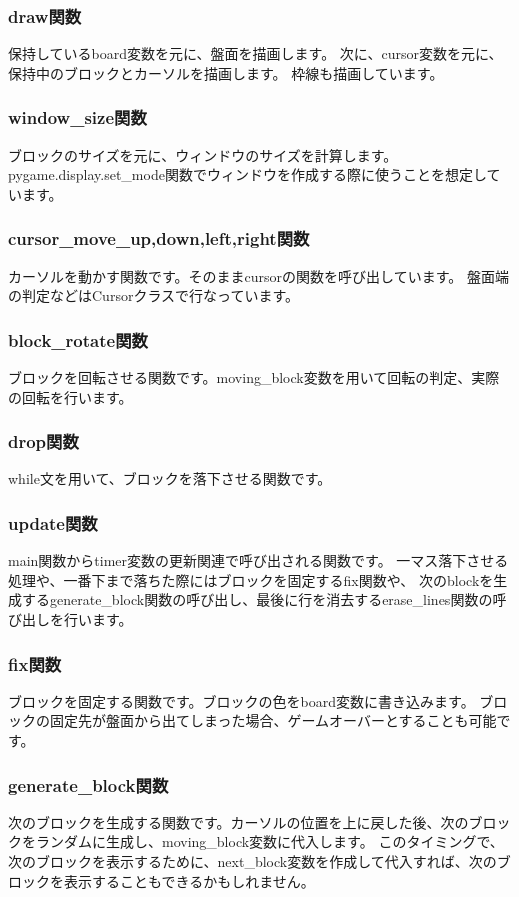 \subsubsection{draw関数}
保持しているboard変数を元に、盤面を描画します。
次に、cursor変数を元に、保持中のブロックとカーソルを描画します。
枠線も描画しています。

\subsubsection{window\_size関数}
ブロックのサイズを元に、ウィンドウのサイズを計算します。
pygame.display.set\_mode関数でウィンドウを作成する際に使うことを想定しています。

\subsubsection{cursor\_move\_up,down,left,right関数}
カーソルを動かす関数です。そのままcursorの関数を呼び出しています。
盤面端の判定などはCursorクラスで行なっています。

\subsubsection{block\_rotate関数}
ブロックを回転させる関数です。moving\_block変数を用いて回転の判定、実際の回転を行います。

\subsubsection{drop関数}
while文を用いて、ブロックを落下させる関数です。

\subsubsection{update関数}
main関数からtimer変数の更新関連で呼び出される関数です。
一マス落下させる処理や、一番下まで落ちた際にはブロックを固定するfix関数や、
次のblockを生成するgenerate\_block関数の呼び出し、最後に行を消去するerase\_lines関数の呼び出しを行います。

\subsubsection{fix関数}
ブロックを固定する関数です。ブロックの色をboard変数に書き込みます。
ブロックの固定先が盤面から出てしまった場合、ゲームオーバーとすることも可能です。

\subsubsection{generate\_block関数}
次のブロックを生成する関数です。カーソルの位置を上に戻した後、次のブロックをランダムに生成し、moving\_block変数に代入します。
このタイミングで、次のブロックを表示するために、next\_block変数を作成して代入すれば、次のブロックを表示することもできるかもしれません。


